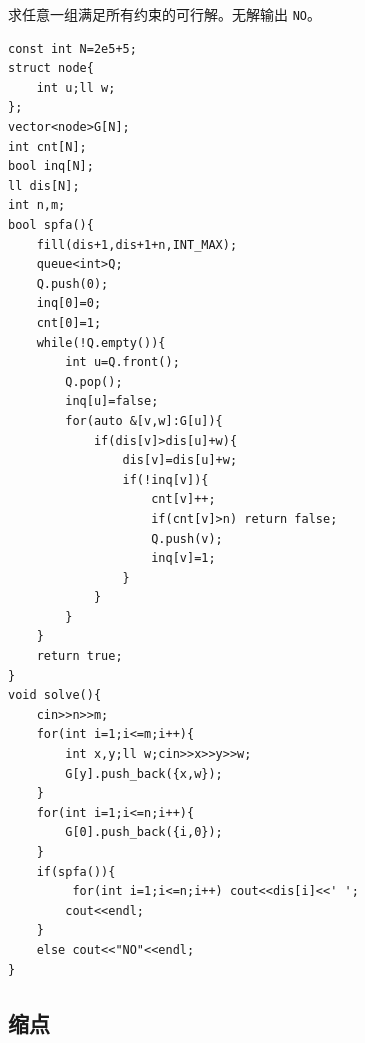 \documentclass[11pt,a4paper,twocolumn]{ctexart}  %
\begin{document}
求任意一组满足所有约束的可行解。无解输出 \texttt{NO}。

\begin{lstlisting}[caption={spfa差分约束},label={lst:spfa差分约束}]
const int N=2e5+5;
struct node{
    int u;ll w;
};
vector<node>G[N];
int cnt[N];
bool inq[N];
ll dis[N];
int n,m;
bool spfa(){
    fill(dis+1,dis+1+n,INT_MAX);
    queue<int>Q;
    Q.push(0);
    inq[0]=0;
    cnt[0]=1;
    while(!Q.empty()){
        int u=Q.front();
        Q.pop();
        inq[u]=false;
        for(auto &[v,w]:G[u]){
            if(dis[v]>dis[u]+w){
                dis[v]=dis[u]+w;
                if(!inq[v]){
                    cnt[v]++;
                    if(cnt[v]>n) return false;
                    Q.push(v);
                    inq[v]=1;
                }
            }
        }
    }
    return true;
}
void solve(){
    cin>>n>>m;
    for(int i=1;i<=m;i++){
        int x,y;ll w;cin>>x>>y>>w;
        G[y].push_back({x,w});
    }
    for(int i=1;i<=n;i++){
        G[0].push_back({i,0});
    }
    if(spfa()){
         for(int i=1;i<=n;i++) cout<<dis[i]<<' ';
        cout<<endl;
    }
    else cout<<"NO"<<endl;
}
\end{lstlisting}
\subsection{缩点}
\end{document}
